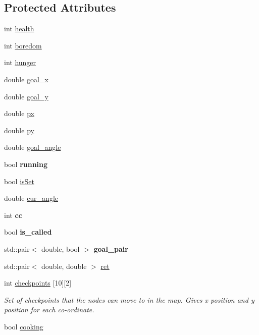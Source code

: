 \subsection*{Protected Attributes}
\begin{DoxyCompactItemize}
\item 
int \hyperlink{classAssistant_a13877ed73a684f59171c686186110870}{health}
\item 
int \hyperlink{classAssistant_a1f237fcda74950177c10cc26ea778863}{boredom}
\item 
int \hyperlink{classAssistant_ad109fd18cc762f9b9f7e64b626ec5d48}{hunger}
\item 
double \hyperlink{classAssistant_a1a1f1fe48d0eb6a6a39b7fbdb2ef6641}{goal\-\_\-x}
\item 
double \hyperlink{classAssistant_a1b6ce5d7c3124140be8d351c847fe91c}{goal\-\_\-y}
\item 
double \hyperlink{classAssistant_a694fdaa5fb378340c42b7f75716cd1ce}{px}
\item 
double \hyperlink{classAssistant_ae092b444c226b5ffbdf454ad24f630d6}{py}
\item 
double \hyperlink{classAssistant_ae4468e02db193f0ffa0ca17a249f802d}{goal\-\_\-angle}
\item 
\hypertarget{classAssistant_a23a1a8275bd6637f9d51e64fc77541d9}{bool {\bfseries running}}\label{classAssistant_a23a1a8275bd6637f9d51e64fc77541d9}

\item 
bool \hyperlink{classAssistant_a939484adfb9673d2608282124ef348b9}{is\-Set}
\item 
double \hyperlink{classAssistant_a451a20f551c43d0b6810c8208fe84773}{cur\-\_\-angle}
\item 
\hypertarget{classAssistant_a6ab1f06230072f8b32d6a0a7c8421f6e}{int {\bfseries cc}}\label{classAssistant_a6ab1f06230072f8b32d6a0a7c8421f6e}

\item 
\hypertarget{classAssistant_af2f914caf84e27c9e14fdb2367ef9efe}{bool {\bfseries is\-\_\-called}}\label{classAssistant_af2f914caf84e27c9e14fdb2367ef9efe}

\item 
\hypertarget{classAssistant_ab02623d3ac8868e28de116fe0b00f509}{std\-::pair$<$ double, bool $>$ {\bfseries goal\-\_\-pair}}\label{classAssistant_ab02623d3ac8868e28de116fe0b00f509}

\item 
std\-::pair$<$ double, double $>$ \hyperlink{classAssistant_a741527493a17d0f6dc512c03a2055fc1}{ret}
\item 
int \hyperlink{classAssistant_ac3c8eb895beffec2e70b25184c7fcae9}{checkpoints} \mbox{[}10\mbox{]}\mbox{[}2\mbox{]}
\begin{DoxyCompactList}\small\item\em Set of checkpoints that the nodes can move to in the map. Gives x position and y position for each co-\/ordinate. \end{DoxyCompactList}\item 
bool \hyperlink{classAssistant_af9a992d4b1c5036ed73c57c7e1c5c258}{cooking}
\end{DoxyCompactItemize}
